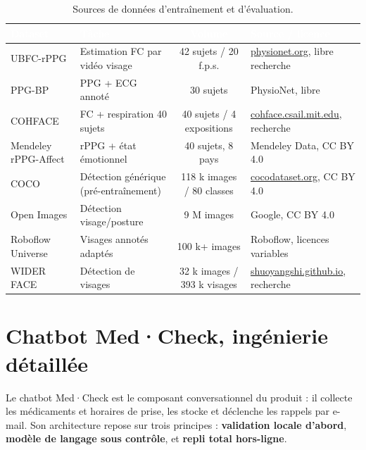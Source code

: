 \documentclass[11pt,a4paper]{article}
\begin{document}
\begin{table}[H]
\centering\scriptsize
\begin{tabularx}{\linewidth}{p{3.6cm} p{3.3cm} c X}
\toprule
\rowcolor{cwblue} \textcolor{white}{\bf Dataset} & \textcolor{white}{\bf Tâche} & \textcolor{white}{\bf
Volume} & \textcolor{white}{\bf Source / licence} \\
\midrule
UBFC-rPPG & Estimation FC par vidéo visage & 42 sujets / 20 f.p.s. & \url{physionet.org}, libre
 recherche \\
PPG-BP \cite{pami2017} & PPG + ECG annoté & 30 sujets & PhysioNet, libre \\
COHFACE & FC + respiration 40 sujets & 40 sujets / 4 expositions & \url{cohface.csail.mit.edu},
recherche \\
Mendeley rPPG-Affect & rPPG + état émotionnel & 40 sujets, 8 pays & Mendeley Data, CC BY 4.0 \\
COCO & Détection générique (pré-entraînement) & 118 k images / 80 classes & \url{cocodataset.org},
CC BY 4.0 \\
Open Images & Détection visage/posture & 9 M images & Google, CC BY 4.0 \\
Roboflow Universe & Visages annotés adaptés & 100 k+ images & Roboflow, licences variables \\
WIDER FACE & Détection de visages & 32 k images / 393 k visages & \url{shuoyangshi.github.io},
recherche \\
\bottomrule
\end{tabularx}
\caption{Sources de données d'entraînement et d'évaluation.}
\label{tab:datasets}
\end{table}

\section{Chatbot Med·Check, ingénierie détaillée}
\label{sec:chatbot}

Le chatbot Med·Check est le composant conversationnel du produit : il collecte les médicaments et
horaires de prise, les stocke et déclenche les rappels par e-mail. Son architecture repose sur trois
principes : \textbf{validation locale d'abord}, \textbf{modèle de langage sous contrôle}, et
\textbf{repli total hors-ligne}.
\end{document}
